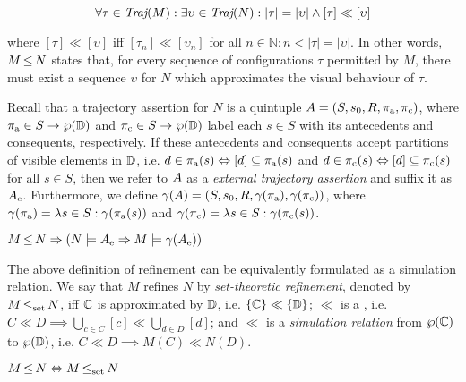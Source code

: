 \begin{equation*}
\forall \tau \in \operatorname{\textit{Traj}}(M) : \exists \upsilon \in \operatorname{\textit{Traj}}(N) : | \tau | = | \upsilon | \wedge [\tau] \ll [\upsilon]
\end{equation*}

\noindent where $[\tau] \ll [\upsilon]$ iff $[\tau_{n}] \ll [\upsilon_{n}]$ for all $n \in \mathbb{N} : n < | \tau | = | \upsilon |$. In other words, $M \operatorname{\leq} N$ states that, for every sequence of configurations $\tau$ permitted by $M$, there must exist a sequence $\upsilon$ for $N$ which approximates the visual behaviour of $\tau$.

Recall that a trajectory assertion for $N$ is a quintuple $A = (S, s_{0}, R, \operatorname{\pi_{\textrm{a}}}, \operatorname{\pi_{\textrm{c}}})$, where $\operatorname{\pi_{\textrm{a}}} \in S \rightarrow \wp(\mathbb{D})$ and $\operatorname{\pi_{\textrm{c}}} \in S \rightarrow \wp(\mathbb{D})$ label each $s \in S$ with its antecedents and consequents, respectively. If these antecedents and consequents accept partitions of visible elements in $\mathbb{D}$, i.e. $d \in \operatorname{\pi_{\textrm{a}}}(s) \Leftrightarrow [d] \subseteq \operatorname{\pi_{\textrm{a}}}(s)$ and $d \in \operatorname{\pi_{\textrm{c}}}(s) \Leftrightarrow [d] \subseteq \operatorname{\pi_{\textrm{c}}}(s)$ for all $s \in S$, then we refer to $A$ as a \textit{external trajectory assertion} and suffix it as $A_{\textrm{e}}$. Furthermore, we define $\gamma(A) = (S, s_{0}, R, \gamma(\operatorname{\pi_{\textrm{a}}}), \gamma(\operatorname{\pi_{\textrm{c}}}))$, where $\gamma(\operatorname{\pi_{\textrm{a}}}) = \lambda s \in S : \gamma(\operatorname{\pi_{\textrm{a}}}(s))$ and $\gamma(\operatorname{\pi_{\textrm{c}}}) = \lambda s \in S : \gamma(\operatorname{\pi_{\textrm{c}}}(s))$.


\begin{theorem} \label{thm:traj-refines}
$M \operatorname{\leq} N \Rightarrow (N \models A_{\textrm{e}} \Rightarrow M \models \gamma(A_{\textrm{e}}))$
\end{theorem}

The above definition of refinement can be equivalently formulated as a simulation relation. We say that $M$ refines $N$ by \textit{set-theoretic refinement}, denoted by $M \operatorname{\operatorname{\leq}_{\textrm{set}}} N$, iff $\mathbb{C}$ is approximated by $\mathbb{D}$, i.e. $\{ \mathbb{C} \} \ll \{ \mathbb{D} \}$; $\ll$ is a , i.e. $C \ll D \implies \bigcup_{c \in C}[c] \ll \bigcup_{d \in D}[d]$; and $\ll$ is a \textit{simulation relation} from $\wp(\mathbb{C})$ to $\wp(\mathbb{D})$, i.e. $C \ll D \implies M(C) \ll N(D)$.


\begin{theorem} \label{thm:traj-equal-set}
$M \operatorname{\leq} N \Leftrightarrow M \operatorname{\operatorname{\leq}_{\textrm{set}}} N$
\end{theorem}
